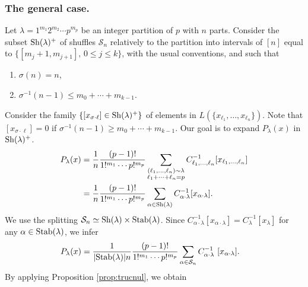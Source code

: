 \documentclass[12pt]{article}
\begin{document}
\subsubsection{The general case.}
Let $\lambda = 1^{m_1}2^{m_2}\cdots p^{m_p}$ be an integer partition of $p$ with $n$ parts. Consider the subset ${\rm Sh}({\lambda})^{+}$ of shuffles $\mathcal{S}_{n}$ relatively to the partition into intervals of $[n]$ equal to $\{ [m_j+1, m_{j+1}],\, 0\leq j \leq k\}$, with the usual conventions, and such that 
\begin{enumerate}
\item $\sigma(n)=n$,
\item $\sigma^{-1}(n-1) \leq m_0+\cdots+m_{k-1}$.
\end{enumerate}
Consider the family $\{ [x_{\sigma \cdot \ell}] \in {\rm Sh}({\lambda})^{+} \}$ of elements in $L(\{x_{\ell_1},\ldots,x_{\ell_n}\})$. Note that $[x_{\sigma \cdot \ell}]=0$ if $\sigma^{-1}(n-1)\geq m_0+\cdots+m_{k-1}$. Our goal is to expand $P_{\lambda}(x)$ in ${\rm Sh}(\lambda)^{+}$.
\begin{align}
P_{\lambda}(x) &= \frac{1}{n}\frac{(p-1)!}{1!^{m_1}\cdots  p!^{m_p}} \sum_{\substack{(\ell_1,\ldots,\ell_n)\sim \lambda \\ \ell_1+\cdots+\ell_n=p}} C^{-1}_{\ell_1,\ldots,\ell_n}[x_{\ell_1,\ldots,\ell_n}]\\ 
&= \frac{1}{n}\frac{(p-1)!}{1!^{m_1}\cdots  p!^{m_p}} \sum_{\alpha \in {\rm Sh}(\lambda)} C^{-1}_{\alpha \cdot \lambda}[x_{\alpha \cdot \lambda}].
\end{align}
We use the splitting $\mathcal{S}_{n} \simeq {\rm Sh}(\lambda)\times {\rm Stab}(\lambda)$. Since $C^{-1}_{\alpha \cdot \lambda}[x_{\alpha \cdot \lambda}] = C^{-1}_{\lambda}[x_{\lambda}]$ for any $\alpha\in {\rm Stab}(\lambda)$, we infer
\begin{align}
P_{\lambda}(x) &=\frac{1}{|{\rm Stab}(\lambda)|n}\frac{(p-1)!}{1!^{m_1}\cdots  p!^{m_p}} \sum_{\alpha \in \mathcal{S}_n} C^{-1}_{\alpha\cdot\lambda} \,\,[x_{\alpha\cdot\lambda}].
\end{align}
By applying Proposition \ref{prop:trucnul}, we obtain
\end{document}
